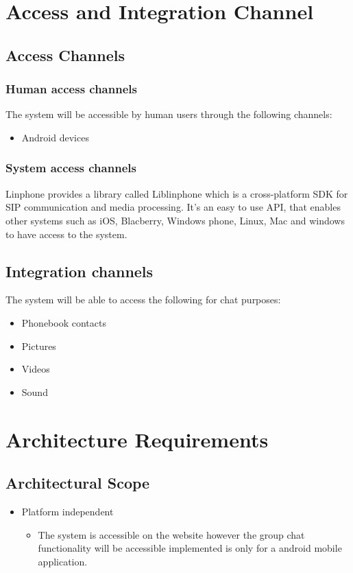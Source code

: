 \documentclass[a4paper]{article}
\begin{document}
\section{\textbf{Access and Integration Channel}}
	\subsection{Access Channels}
	\subsubsection{Human access channels}
	The system will be accessible by human users through the following channels:
	\begin{itemize}
	\item Android devices
	\end{itemize}

	\subsubsection{System access channels}
	Linphone provides a library called Liblinphone which is a cross-platform SDK for SIP communication and media processing. It's an easy to use API, that enables other systems such as iOS, Blacberry, Windows phone, Linux, Mac and windows to have access to the system.
	
	
	\subsection{Integration channels}
	The system will be able to access the following for chat purposes:
	\begin{itemize}
	\item Phonebook contacts
	\item Pictures
	\item Videos
	\item Sound
	\end{itemize}
	
	
\section{\textbf{Architecture Requirements}}

\subsection{Architectural Scope}
\begin{itemize}	
		\item Platform independent
			\begin{itemize}
				\item The system is accessible on the website however the group chat functionality will be accessible implemented is only for a android mobile application.
			\end{itemize}
\end{itemize}
\end{document}

